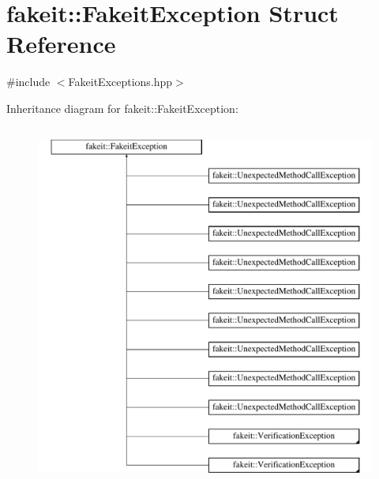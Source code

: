\hypertarget{structfakeit_1_1FakeitException}{}\section{fakeit\+::Fakeit\+Exception Struct Reference}
\label{structfakeit_1_1FakeitException}


{\ttfamily \#include $<$Fakeit\+Exceptions.\+hpp$>$}

Inheritance diagram for fakeit\+::Fakeit\+Exception\+:\begin{figure}[H]
\begin{center}
\leavevmode
\includegraphics[height=12.000000cm]{structfakeit_1_1FakeitException}
\end{center}
\end{figure}

